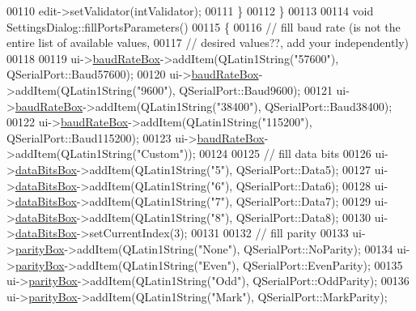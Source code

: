\begin{DoxyCode}
{{{{{00110         edit->setValidator(intValidator);
00111     \}
00112 \}
00113 
00114 \textcolor{keywordtype}{void} SettingsDialog::fillPortsParameters()
00115 \{
00116     \textcolor{comment}{// fill baud rate (is not the entire list of available values,}
00117     \textcolor{comment}{// desired values??, add your independently)}
00118 
00119     ui->\hyperlink{a00029_a766a61db4a8c72219543f7c096ae5601}{baudRateBox}->addItem(QLatin1String(\textcolor{stringliteral}{"57600"}), QSerialPort::Baud57600);
00120     ui->\hyperlink{a00029_a766a61db4a8c72219543f7c096ae5601}{baudRateBox}->addItem(QLatin1String(\textcolor{stringliteral}{"9600"}), QSerialPort::Baud9600);
00121     ui->\hyperlink{a00029_a766a61db4a8c72219543f7c096ae5601}{baudRateBox}->addItem(QLatin1String(\textcolor{stringliteral}{"38400"}), QSerialPort::Baud38400);
00122     ui->\hyperlink{a00029_a766a61db4a8c72219543f7c096ae5601}{baudRateBox}->addItem(QLatin1String(\textcolor{stringliteral}{"115200"}), QSerialPort::Baud115200);
00123     ui->\hyperlink{a00029_a766a61db4a8c72219543f7c096ae5601}{baudRateBox}->addItem(QLatin1String(\textcolor{stringliteral}{"Custom"}));
00124 
00125     \textcolor{comment}{// fill data bits}
00126     ui->\hyperlink{a00029_ab6082bb196e22af4ca04a04db3402166}{dataBitsBox}->addItem(QLatin1String(\textcolor{stringliteral}{"5"}), QSerialPort::Data5);
00127     ui->\hyperlink{a00029_ab6082bb196e22af4ca04a04db3402166}{dataBitsBox}->addItem(QLatin1String(\textcolor{stringliteral}{"6"}), QSerialPort::Data6);
00128     ui->\hyperlink{a00029_ab6082bb196e22af4ca04a04db3402166}{dataBitsBox}->addItem(QLatin1String(\textcolor{stringliteral}{"7"}), QSerialPort::Data7);
00129     ui->\hyperlink{a00029_ab6082bb196e22af4ca04a04db3402166}{dataBitsBox}->addItem(QLatin1String(\textcolor{stringliteral}{"8"}), QSerialPort::Data8);
00130     ui->\hyperlink{a00029_ab6082bb196e22af4ca04a04db3402166}{dataBitsBox}->setCurrentIndex(3);
00131 
00132     \textcolor{comment}{// fill parity}
00133     ui->\hyperlink{a00029_a88c0b5d1f96a308ab115937b090f7bba}{parityBox}->addItem(QLatin1String(\textcolor{stringliteral}{"None"}), QSerialPort::NoParity);
00134     ui->\hyperlink{a00029_a88c0b5d1f96a308ab115937b090f7bba}{parityBox}->addItem(QLatin1String(\textcolor{stringliteral}{"Even"}), QSerialPort::EvenParity);
00135     ui->\hyperlink{a00029_a88c0b5d1f96a308ab115937b090f7bba}{parityBox}->addItem(QLatin1String(\textcolor{stringliteral}{"Odd"}), QSerialPort::OddParity);
00136     ui->\hyperlink{a00029_a88c0b5d1f96a308ab115937b090f7bba}{parityBox}->addItem(QLatin1String(\textcolor{stringliteral}{"Mark"}), QSerialPort::MarkParity);
}}}}}
\end{DoxyCode}
